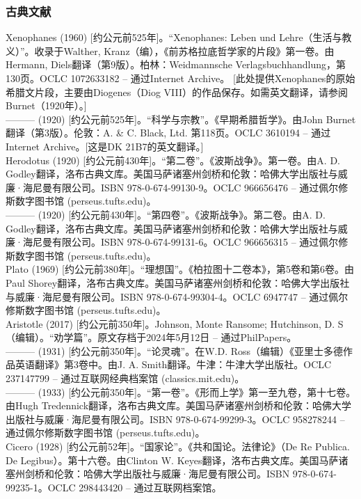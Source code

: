 \subsubsection{古典文献} 
Xenophanes (1960) [约公元前525年]。“Xenophanes: Leben und Lehre（生活与教义）”。收录于Walther, Kranz（编），《前苏格拉底哲学家的片段》第一卷。由Hermann, Diels翻译（第9版）。柏林：Weidmannsche Verlagsbuchhandlung，第130页。OCLC 1072633182 – 通过Internet Archive。 [此处提供Xenophanes的原始希腊文片段，主要由Diogenes（Diog VIII）的作品保存。如需英文翻译，请参阅Burnet（1920年）。]\\
——— (1920) [约公元前525年]。“科学与宗教”。《早期希腊哲学》。由John Burnet翻译（第3版）。伦敦：A. & C. Black, Ltd. 第118页。OCLC 3610194 – 通过Internet Archive。[这是DK 21B7的英文翻译。]\\
Herodotus (1920) [约公元前430年]。“第二卷”。《波斯战争》。第一卷。由A. D. Godley翻译，洛布古典文库。美国马萨诸塞州剑桥和伦敦：哈佛大学出版社与威廉·海尼曼有限公司。ISBN 978-0-674-99130-9。OCLC 966656476 – 通过佩尔修斯数字图书馆 (perseus.tufts.edu)。\\
——— (1920) [约公元前430年]。“第四卷”。《波斯战争》。第二卷。由A. D. Godley翻译，洛布古典文库。美国马萨诸塞州剑桥和伦敦：哈佛大学出版社与威廉·海尼曼有限公司。ISBN 978-0-674-99131-6。OCLC 966656315 – 通过佩尔修斯数字图书馆 (perseus.tufts.edu)。\\
Plato (1969) [约公元前380年]。“理想国”。《柏拉图十二卷本》，第5卷和第6卷。由Paul Shorey翻译，洛布古典文库。美国马萨诸塞州剑桥和伦敦：哈佛大学出版社与威廉·海尼曼有限公司。ISBN 978-0-674-99304-4。OCLC 6947747 – 通过佩尔修斯数字图书馆 (perseus.tufts.edu)。\\
Aristotle (2017) [约公元前350年]。Johnson, Monte Ransome; Hutchinson, D. S（编辑）。“劝学篇”。原文存档于2024年5月12日 – 通过PhilPapers。\\
——— (1931) [约公元前350年]。“论灵魂”。在W.D. Ross（编辑）《亚里士多德作品英语翻译》第3卷中。由J. A. Smith翻译。牛津：牛津大学出版社。OCLC 237147799 – 通过互联网经典档案馆 (classics.mit.edu)。\\
——— (1933) [约公元前350年]。“第一卷”。《形而上学》第一至九卷，第十七卷。由Hugh Tredennick翻译，洛布古典文库。美国马萨诸塞州剑桥和伦敦：哈佛大学出版社与威廉·海尼曼有限公司。ISBN 978-0-674-99299-3。OCLC 958278244 – 通过佩尔修斯数字图书馆 (perseus.tufts.edu)。\\
Cicero (1928) [约公元前52年]。“国家论”。《共和国论。法律论》（De Re Publica. De Legibus）。第十六卷。由Clinton W. Keyes翻译，洛布古典文库。美国马萨诸塞州剑桥和伦敦：哈佛大学出版社与威廉·海尼曼有限公司。ISBN 978-0-674-99235-1。OCLC 298443420 – 通过互联网档案馆。\\
